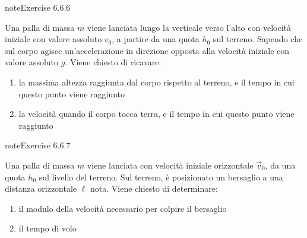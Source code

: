 \documentclass[letterpaper,10pt,italian]{jupyterBook}
\begin{document}
\begin{sphinxadmonition}{note}{Exercise 6.6.6}



\sphinxAtStartPar
Una palla di massa \(m\) viene lanciata lungo la verticale verso l’alto con velocità iniziale con valore assoluto \(v_0\), a partire da una quota \(h_0\) sul terreno. Sapendo che sul corpo agisce un’accelerazione in direzione opposta alla velocità iniziale con valore assoluto \(g\). Viene chiesto di ricavare:
\begin{enumerate}
%
\item {} 
\sphinxAtStartPar
la massima altezza raggiunta dal corpo rispetto al terreno, e il tempo in cui questo punto viene raggiunto

\item {} 
\sphinxAtStartPar
la velocità quando il corpo tocca terra, e il tempo in cui questo punto viene raggiunto

\end{enumerate}
\end{sphinxadmonition}
 \label{exercise:ch/mechanics/kinematics-problems-exercise-6}

\begin{sphinxadmonition}{note}{Exercise 6.6.7}



\sphinxAtStartPar
Una palla di massa \(m\) viene lanciata con velocità iniziale orizzontale \(\vec{v}_0\), da una quota \(h_0\) sul livello del terreno. Sul terreno, è posizionato un bersaglio a una distanza orizzontale \(\ell\) nota. Viene chiesto di determinare:
\begin{enumerate}
%
\item {} 
\sphinxAtStartPar
il modulo della velocità necessario per colpire il bersaglio

\item {} 
\sphinxAtStartPar
il tempo di volo

\end{enumerate}
\end{sphinxadmonition}
 \label{exercise:ch/mechanics/kinematics-problems-exercise-7}
\end{document}
